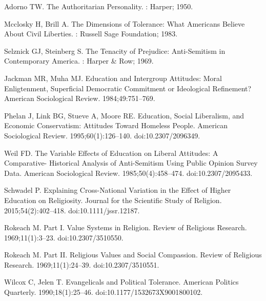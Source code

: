 \documentclass[10pt,letterpaper]{article}
\begin{document}
\begin{thebibliography}{10}
Adorno TW.
\newblock The {{Authoritarian Personality}}.
: {Harper}; 1950.

Mcclosky H, Brill A.
\newblock The {{Dimensions}} of {{Tolerance}}: {{What Americans Believe About
  Civil Liberties}}.
: {Russell Sage Foundation}; 1983.

Selznick GJ, Steinberg S.
\newblock The {{Tenacity}} of {{Prejudice}}: Anti-{{Semitism}} in
  {{Contemporary America}}.
: {Harper \& Row}; 1969.

Jackman MR, Muha MJ.
\newblock Education and {{Intergroup Attitudes}}: {{Moral Enligtenment}},
  {{Superficial Democratic Commitment}} or {{Ideological Refinement}}?
\newblock American Sociological Review. 1984;49:751--769.

Phelan J, Link BG, Stueve A, Moore RE.
\newblock Education, {{Social Liberalism}}, and {{Economic Conservatism}}:
  {{Attitudes Toward Homeless People}}.
\newblock American Sociological Review. 1995;60(1):126--140.
\newblock doi:{10.2307/2096349}.

Weil FD.
\newblock The {{Variable Effects}} of {{Education}} on {{Liberal Attitudes}}:
  {{A Comparative}}- {{Historical Analysis}} of {{Anti}}-{{Semitism Using
  Public Opinion Survey Data}}.
\newblock American Sociological Review. 1985;50(4):458--474.
\newblock doi:{10.2307/2095433}.

Schwadel P.
\newblock Explaining {{Cross}}-{{National Variation}} in the {{Effect}} of
  {{Higher Education}} on {{Religiosity}}.
\newblock Journal for the Scientific Study of Religion. 2015;54(2):402--418.
\newblock doi:{10.1111/jssr.12187}.

Rokeach M.
\newblock Part {{I}}. {{Value Systems}} in {{Religion}}.
\newblock Review of Religious Research. 1969;11(1):3--23.
\newblock doi:{10.2307/3510550}.

Rokeach M.
\newblock Part {{II}}. {{Religious Values}} and {{Social Compassion}}.
\newblock Review of Religious Research. 1969;11(1):24--39.
\newblock doi:{10.2307/3510551}.

Wilcox C, Jelen T.
\newblock Evangelicals and {{Political Tolerance}}.
\newblock American Politics Quarterly. 1990;18(1):25--46.
\newblock doi:{10.1177/1532673X9001800102}.


\end{thebibliography}
\end{document}

